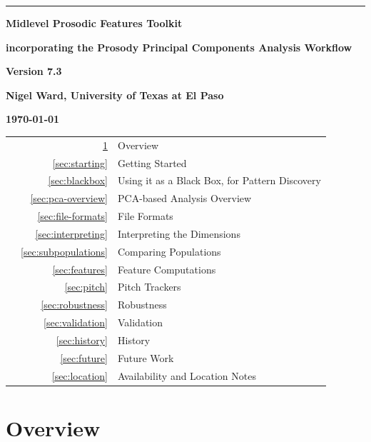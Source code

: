 \documentclass[11pt]{article}
\begin{document}
\noindent
\thispagestyle{empty}
\sloppy

\rule{1mm}{0mm}

\vspace{-17mm}
{\LARGE \bf Midlevel Prosodic Features Toolkit }

\smallskip
{\large \bf incorporating the  Prosody Principal Components Analysis Workflow}
\medskip


{\LARGE \bf Version 7.3}
\vspace{7mm}


{\bf Nigel Ward, University of Texas at El Paso}

{\bf \today }

\vspace{-1ex}

\begin{tabular}{p{7cm}rl}
  & \ref{sec:overview} & Overview  \\
  & \ref{sec:starting} & Getting Started \\
  & \ref{sec:blackbox} & Using it as a Black Box, for Pattern Discovery \\
  & \ref{sec:pca-overview} & PCA-based Analysis Overview \\
  & \ref{sec:file-formats} & File Formats \\
  & \ref{sec:interpreting}  & Interpreting the Dimensions \\
  & \ref{sec:subpopulations}  & Comparing Populations \\
  & \ref{sec:features} & Feature Computations\\ 
  & \ref{sec:pitch} & Pitch Trackers \\ 
  & \ref{sec:robustness} & Robustness \\
  & \ref{sec:validation} & Validation \\
  & \ref{sec:history} & History \\
  & \ref{sec:future} & Future Work \\
  & \ref{sec:location} & Availability and Location Notes
\end{tabular}

\vspace{-3.5ex}
\section{Overview}    \label{sec:overview}
\end{document}
